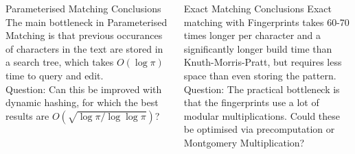 \documentclass[ %
                    author={Dominic Moylett},
                supervisor={Dr. Raphael Clifford, Dr. Markus Jalsenius and Dr. Ben Sach},
                     title={An Empirical Analysis of Data Streaming Algorithms},
                  subtitle={},
                    degree={MEng},
                      year={2014} ]{poster}
\begin{document}
\begin{frame}{}
\begin{columns}[t]
  \begin{column}{0.422\linewidth}
  \begin{block}{\Large Parameterised Matching Conclusions}
  The main bottleneck in Parameterised Matching is that previous occurances of characters in the text are stored in a search tree, which takes $O(\log\pi)$ time to query and edit.\\
  \vspace{\baselineskip}
  Question: Can this be improved with dynamic hashing, for which the best results are $O(\sqrt{\log\pi/\log\log\pi})$?
  \end{block}
  \end{column}
  \begin{column}{0.422\linewidth}
  \begin{block}{\Large Exact Matching Conclusions}
  Exact matching with Fingerprints takes 60-70 times longer per character and a significantly longer build time than Knuth-Morris-Pratt, but requires less space than even storing the pattern.\\
  \vspace{\baselineskip}
  Question: The practical bottleneck is that the fingerprints use a lot of modular multiplications. Could these be optimised via precomputation or Montgomery Multiplication?
  \end{block}
  \end{column}
\end{columns}

\vfill

\end{frame}

\end{document}
